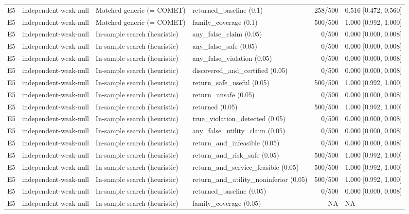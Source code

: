 \begin{longtable}{p{.04\linewidth}p{.18\linewidth}p{.19\linewidth}p{.16\linewidth}r p{.21\linewidth}}
E5 & independent-weak-null & Matched generic (= COMET) & returned\_baseline (0.1) & 258/500 & 0.516 [0.472, 0.560]\\
E5 & independent-weak-null & Matched generic (= COMET) & family\_coverage (0.1) & 500/500 & 1.000 [0.992, 1.000]\\
E5 & independent-weak-null & In-sample search (heuristic) & any\_false\_claim (0.05) & 0/500 & 0.000 [0.000, 0.008]\\
E5 & independent-weak-null & In-sample search (heuristic) & any\_false\_safe (0.05) & 0/500 & 0.000 [0.000, 0.008]\\
E5 & independent-weak-null & In-sample search (heuristic) & any\_false\_violation (0.05) & 0/500 & 0.000 [0.000, 0.008]\\
E5 & independent-weak-null & In-sample search (heuristic) & discovered\_and\_certified (0.05) & 0/500 & 0.000 [0.000, 0.008]\\
E5 & independent-weak-null & In-sample search (heuristic) & return\_safe\_useful (0.05) & 500/500 & 1.000 [0.992, 1.000]\\
E5 & independent-weak-null & In-sample search (heuristic) & return\_unsafe (0.05) & 0/500 & 0.000 [0.000, 0.008]\\
E5 & independent-weak-null & In-sample search (heuristic) & returned (0.05) & 500/500 & 1.000 [0.992, 1.000]\\
E5 & independent-weak-null & In-sample search (heuristic) & true\_violation\_detected (0.05) & 0/500 & 0.000 [0.000, 0.008]\\
E5 & independent-weak-null & In-sample search (heuristic) & any\_false\_utility\_claim (0.05) & 0/500 & 0.000 [0.000, 0.008]\\
E5 & independent-weak-null & In-sample search (heuristic) & return\_and\_infeasible (0.05) & 0/500 & 0.000 [0.000, 0.008]\\
E5 & independent-weak-null & In-sample search (heuristic) & return\_and\_risk\_safe (0.05) & 500/500 & 1.000 [0.992, 1.000]\\
E5 & independent-weak-null & In-sample search (heuristic) & return\_and\_service\_feasible (0.05) & 500/500 & 1.000 [0.992, 1.000]\\
E5 & independent-weak-null & In-sample search (heuristic) & return\_and\_utility\_noninferior (0.05) & 500/500 & 1.000 [0.992, 1.000]\\
E5 & independent-weak-null & In-sample search (heuristic) & returned\_baseline (0.05) & 0/500 & 0.000 [0.000, 0.008]\\
E5 & independent-weak-null & In-sample search (heuristic) & family\_coverage (0.05) & NA & NA\\

\end{longtable}
